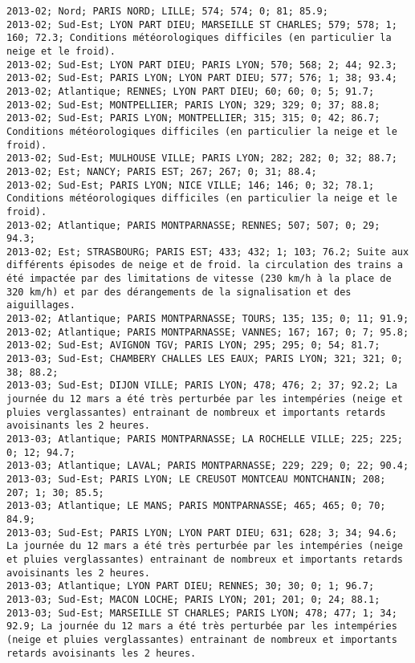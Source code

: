 \documentclass{article}
\begin{document}
\begin{Verbatim}[commandchars=\\\{\}]
2013-02; Nord; PARIS NORD; LILLE; 574; 574; 0; 81; 85.9; 
2013-02; Sud-Est; LYON PART DIEU; MARSEILLE ST CHARLES; 579; 578; 1; 160; 72.3; Conditions météorologiques difficiles (en particulier la neige et le froid).
2013-02; Sud-Est; LYON PART DIEU; PARIS LYON; 570; 568; 2; 44; 92.3; 
2013-02; Sud-Est; PARIS LYON; LYON PART DIEU; 577; 576; 1; 38; 93.4; 
2013-02; Atlantique; RENNES; LYON PART DIEU; 60; 60; 0; 5; 91.7; 
2013-02; Sud-Est; MONTPELLIER; PARIS LYON; 329; 329; 0; 37; 88.8; 
2013-02; Sud-Est; PARIS LYON; MONTPELLIER; 315; 315; 0; 42; 86.7; Conditions météorologiques difficiles (en particulier la neige et le froid).
2013-02; Sud-Est; MULHOUSE VILLE; PARIS LYON; 282; 282; 0; 32; 88.7; 
2013-02; Est; NANCY; PARIS EST; 267; 267; 0; 31; 88.4; 
2013-02; Sud-Est; PARIS LYON; NICE VILLE; 146; 146; 0; 32; 78.1; Conditions météorologiques difficiles (en particulier la neige et le froid).
2013-02; Atlantique; PARIS MONTPARNASSE; RENNES; 507; 507; 0; 29; 94.3; 
2013-02; Est; STRASBOURG; PARIS EST; 433; 432; 1; 103; 76.2; Suite aux différents épisodes de neige et de froid. la circulation des trains a été impactée par des limitations de vitesse (230 km/h à la place de 320 km/h) et par des dérangements de la signalisation et des aiguillages.
2013-02; Atlantique; PARIS MONTPARNASSE; TOURS; 135; 135; 0; 11; 91.9; 
2013-02; Atlantique; PARIS MONTPARNASSE; VANNES; 167; 167; 0; 7; 95.8; 
2013-02; Sud-Est; AVIGNON TGV; PARIS LYON; 295; 295; 0; 54; 81.7; 
2013-03; Sud-Est; CHAMBERY CHALLES LES EAUX; PARIS LYON; 321; 321; 0; 38; 88.2; 
2013-03; Sud-Est; DIJON VILLE; PARIS LYON; 478; 476; 2; 37; 92.2; La journée du 12 mars a été très perturbée par les intempéries (neige et pluies verglassantes) entrainant de nombreux et importants retards avoisinants les 2 heures.
2013-03; Atlantique; PARIS MONTPARNASSE; LA ROCHELLE VILLE; 225; 225; 0; 12; 94.7; 
2013-03; Atlantique; LAVAL; PARIS MONTPARNASSE; 229; 229; 0; 22; 90.4; 
2013-03; Sud-Est; PARIS LYON; LE CREUSOT MONTCEAU MONTCHANIN; 208; 207; 1; 30; 85.5; 
2013-03; Atlantique; LE MANS; PARIS MONTPARNASSE; 465; 465; 0; 70; 84.9; 
2013-03; Sud-Est; PARIS LYON; LYON PART DIEU; 631; 628; 3; 34; 94.6; La journée du 12 mars a été très perturbée par les intempéries (neige et pluies verglassantes) entrainant de nombreux et importants retards avoisinants les 2 heures.
2013-03; Atlantique; LYON PART DIEU; RENNES; 30; 30; 0; 1; 96.7; 
2013-03; Sud-Est; MACON LOCHE; PARIS LYON; 201; 201; 0; 24; 88.1; 
2013-03; Sud-Est; MARSEILLE ST CHARLES; PARIS LYON; 478; 477; 1; 34; 92.9; La journée du 12 mars a été très perturbée par les intempéries (neige et pluies verglassantes) entrainant de nombreux et importants retards avoisinants les 2 heures.

\end{Verbatim}
\end{document}
